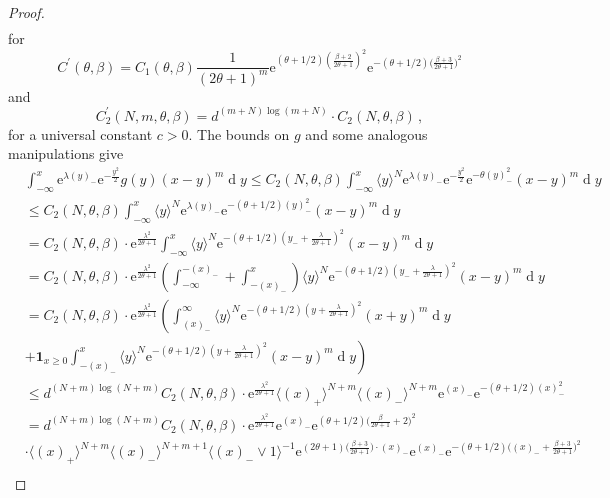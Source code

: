 \documentclass[11pt, reqno]{amsart}
\numberwithin{equation}{section}
\newcommand{\diff}{\ensuremath{\operatorname{d}\!}}
\begin{document}
\begin{proof}
\begin{align*}
    \end{align*}
for \[C^\prime(\theta, \beta) = C_1(\theta, \beta)\frac{1}{(2\theta+1)^m}\mathrm{e}^{(\theta + 1/2)(\frac{\beta+2}{2\theta +1})^2}\mathrm{e}^{-(\theta + 1/2)\big(\frac{\beta+3}{2\theta +1}\big)^2}
\]
and 
\[
C^\prime_2(N, m, \theta, \beta) =  d^{(m+N)\log (m+N)}\cdot C_2(N, \theta, \beta)\,,
\]
for a universal constant $c>0$. The bounds on $g$ and some analogous manipulations give 
    \begin{align*}
         &\displaystyle\int^x_{-\infty} \mathrm{e}^{\lambda (y)_-}\mathrm{e}^{-\frac{y^2}{2}}g(y)(x-y)^m\diff y \le C_2(N, \theta, \beta) \displaystyle\int^x_{-\infty} \langle y\rangle ^N\mathrm{e}^{\lambda (y)_-}\mathrm{e}^{-\frac{y^2}{2}}\mathrm{e}^{-\theta(y)^2_-}(x-y)^m\diff y \\
         &\le C_2(N, \theta, \beta)\displaystyle\int^x_{-\infty}\langle y\rangle ^N \mathrm{e}^{\lambda (y)_-}\mathrm{e}^{-(\theta+1/2)(y)^2_-}(x-y)^m\diff y\\
         & = C_2(N, \theta, \beta)\cdot\mathrm{e}^{\frac{\lambda^2}{2\theta + 1}}\displaystyle\int^x_{-\infty}  \langle y\rangle ^N\mathrm{e}^{-(\theta+1/2)(y_-+\frac{\lambda}{2\theta + 1})^2}(x-y)^m\diff y\\
         & = C_2(N, \theta, \beta)\cdot\mathrm{e}^{\frac{\lambda^2}{2\theta + 1}}\displaystyle\left(\int^{-(x)_-}_{-\infty} + \int^x_{-(x)_-}\right)  \langle y\rangle ^N\mathrm{e}^{-(\theta+1/2)(y_-+\frac{\lambda}{2\theta + 1})^2}(x-y)^m\diff y\\
         & = C_2(N, \theta, \beta)\cdot\mathrm{e}^{\frac{\lambda^2}{2\theta + 1}}\displaystyle\left(\int^{\infty}_{(x)_-} \langle y\rangle ^N\mathrm{e}^{-(\theta+1/2)(y+\frac{\lambda}{2\theta + 1})^2}(x+y)^m\diff y\right.\\
         &\left. + \mathbf{1}_{x\ge 0}\int^x_{-(x)_-}  \langle y\rangle^N \mathrm{e}^{-(\theta+1/2)(y+\frac{\lambda}{2\theta + 1})^2}(x-y)^m\diff y\right)\\
         & \le d^{(N+m)\log(N+m)}C_2(N, \theta, \beta)\cdot\mathrm{e}^{\frac{\lambda^2}{2\theta + 1}}\langle (x)_+\rangle ^{N+m}\langle (x)_-\rangle ^{N+m}\mathrm{e}^{(x)_-}\mathrm{e}^{-(\theta+1/2)(x)_-^2}\\
         & = d^{(N+m)\log(N+m)}C_2(N, \theta, \beta)\cdot\mathrm{e}^{\frac{\lambda^2}{2\theta + 1}} \mathrm{e}^{(x)_-}\mathrm{e}^{(\theta + 1/2)\big(\frac{\beta}{2\theta +1}+ 2\big)^2}\\
         & \cdot \langle (x)_+\rangle ^{N+m}\langle (x)_-\rangle ^{N+m+1}\langle (x)_-\lor 1 \rangle ^{-1}\mathrm{e}^{(2\theta+1)\big(\frac{\beta+3}{2\theta +1}\big) \cdot (x)_-}\mathrm{e}^{(x)_-}\mathrm{e}^{-(\theta + 1/2)\big((x)_- +\frac{\beta+3}{2\theta +1}\big)^2}\\

\end{align*}
\end{proof}
\end{document}
